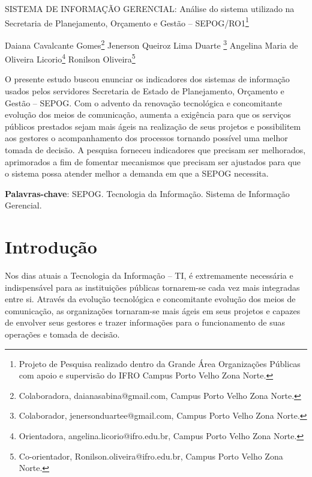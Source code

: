 \documentclass[article,12pt,onesidea,4paper,english,brazil]{abntex2}
\begin{document}
	
	
	\frenchspacing 
	
	\begin{center}
		\LARGE SISTEMA DE INFORMAÇÃO GERENCIAL: Análise do sistema utilizado na Secretaria de Planejamento, Orçamento e Gestão – SEPOG/RO1\footnote{Projeto de Pesquisa realizado dentro da Grande Área Organizações Públicas com apoio e supervisão do IFRO Campus Porto Velho Zona Norte.}
		
		\normalsize
	Daiana Cavalcante Gomes\footnote{Colaboradora, daianasabina@gmail.com, Campus Porto Velho Zona Norte.} 
	Jenerson Queiroz Lima Duarte \footnote{Colaborador, jenersonduartee@gmail.com, Campus Porto Velho Zona Norte.} 
	Angelina Maria de Oliveira Licorio\footnote{Orientadora, angelina.licorio@ifro.edu.br, Campus Porto Velho Zona Norte.} 
	Ronilson Oliveira\footnote{Co-orientador, Ronilson.oliveira@ifro.edu.br, Campus Porto Velho Zona Norte.} 
	\end{center}
	
	\begin{resumoumacoluna}
		O presente estudo buscou enunciar os indicadores dos sistemas de informação usados pelos servidores Secretaria de Estado de Planejamento, Orçamento e Gestão – SEPOG. Com o advento da renovação tecnológica e concomitante evolução dos meios de comunicação, aumenta a exigência para que os serviços públicos prestados sejam mais ágeis na realização de seus projetos e possibilitem aos gestores o acompanhamento dos processos tornando possível uma melhor tomada de decisão. A pesquisa forneceu indicadores que precisam ser melhorados, aprimorados a fim de fomentar mecanismos que precisam ser ajustados para que o sistema possa atender melhor a demanda em que a SEPOG necessita.
		
		\vspace{\onelineskip}
		
		\noindent
		\textbf{Palavras-chave}: SEPOG. Tecnologia da Informação. Sistema de Informação Gerencial.
	\end{resumoumacoluna}
	
	\textual
	
	\section*{Introdução}
	
	Nos dias atuais a Tecnologia da Informação – TI, é extremamente necessária e indispensável para as instituições públicas tornarem-se cada vez mais integradas entre si. Através da evolução tecnológica e concomitante evolução dos meios de comunicação, as organizações tornaram-se mais ágeis em seus projetos e capazes de envolver seus gestores e trazer informações para o funcionamento de suas operações e tomada de decisão.
	
\end{document}
